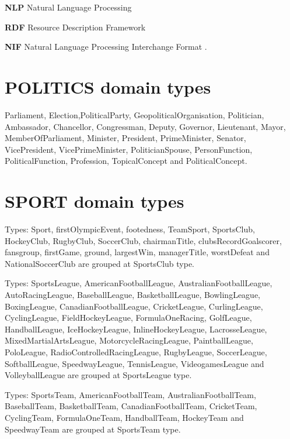 \documentclass[thesis=M,english]{FITthesis}[2018/05/30]
\begin{document}
\textbf{NLP} Natural Language Processing

\textbf{RDF} Resource Description Framework

\textbf{NIF} Natural Language Processing Interchange Format
.

\section{POLITICS domain types}\label{PoliticsTypes}
Parliament, Election,PoliticalParty, GeopoliticalOrganisation, Politician, Ambassador, Chancellor, Congressman, Deputy, Governor, Lieutenant, Mayor, MemberOfParliament, Minister, President, PrimeMinister, Senator, VicePresident, VicePrimeMinister, PoliticianSpouse, PersonFunction, PoliticalFunction, Profession, TopicalConcept and PoliticalConcept.

\section{SPORT domain types}\label{SportTypes}
Types: Sport, firstOlympicEvent, footedness, TeamSport, SportsClub, HockeyClub, RugbyClub, SoccerClub, chairmanTitle, clubsRecordGoalscorer, fansgroup, firstGame, ground, largestWin, managerTitle, worstDefeat and NationalSoccerClub are grouped at SportsClub type.

Types: SportsLeague, AmericanFootballLeague, AustralianFootballLeague, AutoRacingLeague, BaseballLeague, BasketballLeague, BowlingLeague, BoxingLeague, CanadianFootballLeague, CricketLeague, CurlingLeague, CyclingLeague, FieldHockeyLeague, FormulaOneRacing, GolfLeague, HandballLeague, IceHockeyLeague, InlineHockeyLeague, LacrosseLeague, MixedMartialArtsLeague, MotorcycleRacingLeague, PaintballLeague, PoloLeague, RadioControlledRacingLeague, RugbyLeague, SoccerLeague, SoftballLeague, SpeedwayLeague, TennisLeague, VideogamesLeague and VolleyballLeague are grouped at SportsLeague type.

Types: SportsTeam, AmericanFootballTeam, AustralianFootballTeam, BaseballTeam, BasketballTeam, CanadianFootballTeam, CricketTeam, CyclingTeam, FormulaOneTeam, HandballTeam, HockeyTeam and SpeedwayTeam are grouped at SportsTeam type.
\end{document}
